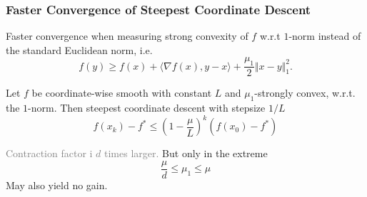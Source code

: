 \documentclass[aspectratio=149]{beamer}
\begin{document}
\begin{frame}
  \frametitle{Faster Convergence of Steepest Coordinate Descent}
  Faster convergence when measuring strong convexity of $f$ w.r.t $1$-norm instead of the standard Euclidean norm, i.e.
  \begin{equation}
      f(y) \ge f(x) + \langle \nabla f(x), y-x \rangle + \frac{\mu_1}{2} \Vert x-y \Vert_1^2.
  \end{equation}

  \begin{theorem}
    Let $f$ be coordinate-wise smooth with constant $L$ and $\mu_1$-strongly convex, w.r.t. the $1$-norm.
    Then \textrm{steepest coordinate descent} with stepsize $1/L$
    \begin{equation}
      f(x_k)- f^* \le {\left(1 - \frac{\mu}{L}\right)}^k (f(x_0)-f^*)
    \end{equation}
  \end{theorem}
  \textcolor{gray}{Contraction factor i $d$ times larger.}
  But only in the extreme
  \begin{equation}
    \frac{\mu}{d} \le \mu_1 \le \mu
  \end{equation}
  May also yield no gain.
\end{frame}
\end{document}
